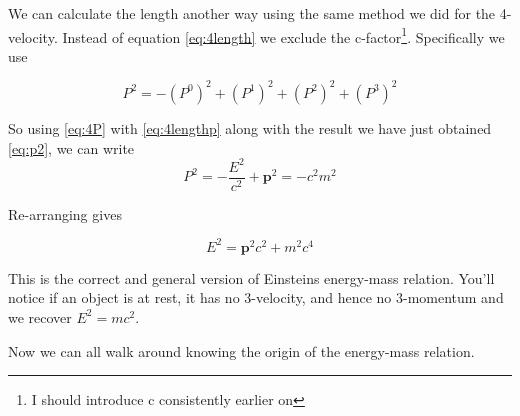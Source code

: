 We can calculate the length another way using the same method we did for the 4-velocity. Instead of equation \eqref{eq:4length} we exclude the c-factor\footnote{I should introduce c consistently earlier on}. Specifically we use

\begin{equation}
  P^2 = - (P^0)^2+ (P^1)^2 + (P^2)^2+(P^3)^2
  \label{eq:4lengthp}
\end{equation}

So using \eqref{eq:4P} with \eqref{eq:4lengthp} along with the result we have just obtained \eqref{eq:p2}, we can write
\begin{equation}
  P^2 = -\frac{E^2}{c^2} + \mathbf{p}^2 = - c^2 m^2 
\end{equation}

Re-arranging gives

\begin{equation}
  E^2 = \mathbf{p}^2 c^2 + m^2 c^4
\end{equation}

This is the correct and general version of Einsteins energy-mass relation. You'll notice if an object is at rest, it has no 3-velocity, and hence no 3-momentum and we recover $E^2 = m c^2$.

Now we can all walk around knowing the origin of the energy-mass relation. 







